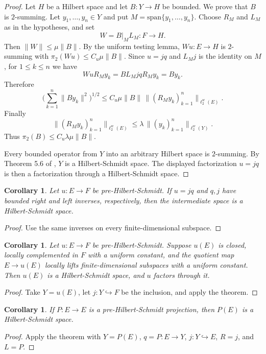 \documentclass[11pt]{amsart}
\newtheorem{corollary}[theorem]{Corollary}
\begin{document}
\begin{proof}
Let $H$ be a Hilbert space and let $B:Y\to H$ be bounded. We prove that
$B$ is $2$-summing. Let $y_1,\ldots,y_n\in Y$ and put
$M=\mathrm{span}\{y_1,\ldots,y_n\}$. Choose $R_M$ and $L_M$ as in the
hypotheses, and set
\[
  W=B|_M L_M:F\to H.
\]
Then $\|W\|\le\mu\|B\|$. By the uniform testing lemma,
$Wu:E\to H$ is $2$-summing with
$\pi_2(Wu)\le C_u\mu\|B\|$. Since $u=jq$ and $L_Mj$ is the identity on
$M$, for $1\le k\le n$ we have
\[
  WuR_My_k=B L_Mj qR_My_k=By_k.
\]
Therefore
\[
  \Big(\sum_{k=1}^n\|By_k\|^2\Big)^{1/2}
  \le C_u\mu\|B\|\,
  \|(R_My_k)_{k=1}^n\|_{\ell_2^w(E)}.
\]
Finally
\[
  \|(R_My_k)_{k=1}^n\|_{\ell_2^w(E)}
  \le \lambda\,\|(y_k)_{k=1}^n\|_{\ell_2^w(Y)}.
\]
Thus $\pi_2(B)\le C_u\lambda\mu\|B\|$.

Every bounded operator from $Y$ into an arbitrary Hilbert space is
$2$-summing. By Theorem 5.6 of \cite{AEH}, $Y$ is a Hilbert-Schmidt
space. The displayed factorization $u=jq$ is then a factorization
through a Hilbert-Schmidt space.
\end{proof}

\begin{corollary}
Let $u:E\to F$ be pre-Hilbert-Schmidt. If $u=jq$ and $q,j$ have bounded
right and left inverses, respectively, then the intermediate space is a
Hilbert-Schmidt space.
\end{corollary}

\begin{proof}
Use the same inverses on every finite-dimensional subspace.
\end{proof}

\begin{corollary}
Let $u:E\to F$ be pre-Hilbert-Schmidt. Suppose $u(E)$ is closed,
locally complemented in $F$ with a uniform constant, and the quotient
map $E\to u(E)$ locally lifts finite-dimensional subspaces with a
uniform constant. Then $u(E)$ is a Hilbert-Schmidt space, and $u$
factors through it.
\end{corollary}

\begin{proof}
Take $Y=u(E)$, let $j:Y\hookrightarrow F$ be the inclusion, and apply
the theorem.
\end{proof}

\begin{corollary}
If $P:E\to E$ is a pre-Hilbert-Schmidt projection, then $P(E)$ is a
Hilbert-Schmidt space.
\end{corollary}

\begin{proof}
Apply the theorem with $Y=P(E)$, $q=P:E\to Y$, $j:Y\hookrightarrow E$,
$R=j$, and $L=P$.
\end{proof}
\end{document}
